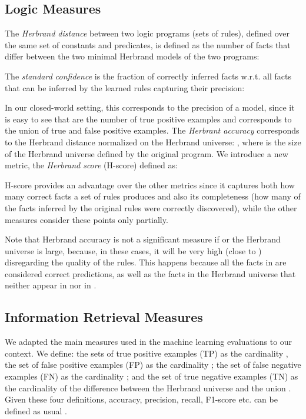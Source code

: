 \documentclass[letterpaper]{article} \usepackage{aaai20}  \usepackage{times}  \usepackage{helvet} \usepackage{courier}  \usepackage[hyphens]{url}  \usepackage{graphicx} \urlstyle{rm} \def\UrlFont{\rm}  \usepackage{graphicx}  \frenchspacing  \setlength{\pdfpagewidth}{8.5in}  \setlength{\pdfpageheight}{11in}  \usepackage{amsthm}
\theoremstyle{definition}
\begin{document}
\subsection{Logic Measures}
The \emph{Herbrand distance}  between two logic programs (sets of rules), defined over the same set of constants and predicates, is defined as the number of facts that differ between the two minimal Herbrand models of the two programs: 


The \emph{standard confidence}  \cite{Galarraga+-VLDBJ15:amiep} 
is the fraction of correctly inferred facts w.r.t. all facts that can be inferred by the learned rules capturing their precision: 

In our closed-world setting, this corresponds to the precision of a model, since it is easy to see that    are the number of true positive examples and  corresponds to the union of true and false positive examples.
The {\it Herbrant accuracy}   corresponds to the Herbrand distance normalized on the Herbrand universe: , where  is the size of the Herbrand universe defined by the original program.
We introduce a new metric, the \emph{Herbrand score} (H-score) defined as:



H-score provides an advantage over the other metrics since it captures both how many correct facts a set of rules produces and also its completeness (how many of the facts inferred by the original rules  were correctly discovered), while the other measures consider these points only partially. 




Note that Herbrand accuracy is not a significant measure if  or the Herbrand universe is large, because, in these cases, it will be very high (close to ) disregarding the quality of the rules. This happens because all the facts in  are considered correct predictions, as well as the facts in the Herbrand universe that neither appear in  nor in .


\subsection{Information Retrieval Measures}\label{sec:ml_measures}
We adapted the main measures used in the machine learning evaluations to our context.
We define: the sets of true positive examples (TP) as the cardinality  , the set of false positive examples (FP) as the cardinality ; the set of false negative examples (FN) as the cardinality ; and the set of true negative examples (TN) as the cardinality of the difference between the Herbrand universe and the union  .
Given these four definitions, accuracy, precision, recall, F1-score etc. can be defined as usual \cite{Russell:2009:AIM:1671238}.
\end{document}
